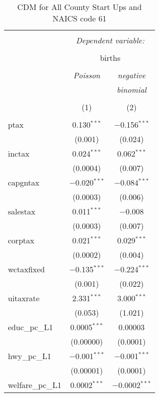 
\begin{table}[!htbp] \centering 
  \caption{CDM for All County Start Ups and NAICS code 61} 
  \label{} 
\begin{tabular}{@{\extracolsep{5pt}}lcc} 
\\[-1.8ex]\hline 
\hline \\[-1.8ex] 
 & \multicolumn{2}{c}{\textit{Dependent variable:}} \\ 
\cline{2-3} 
\\[-1.8ex] & \multicolumn{2}{c}{births} \\ 
\\[-1.8ex] & \textit{Poisson} & \textit{negative} \\ 
 & \textit{} & \textit{binomial} \\ 
\\[-1.8ex] & (1) & (2)\\ 
\hline \\[-1.8ex] 
 ptax & 0.130$^{***}$ & $-$0.156$^{***}$ \\ 
  & (0.001) & (0.024) \\ 
  inctax & 0.024$^{***}$ & 0.062$^{***}$ \\ 
  & (0.0004) & (0.007) \\ 
  capgntax & $-$0.020$^{***}$ & $-$0.084$^{***}$ \\ 
  & (0.0003) & (0.006) \\ 
  salestax & 0.011$^{***}$ & $-$0.008 \\ 
  & (0.0003) & (0.007) \\ 
  corptax & 0.021$^{***}$ & 0.029$^{***}$ \\ 
  & (0.0002) & (0.004) \\ 
  wctaxfixed & $-$0.135$^{***}$ & $-$0.224$^{***}$ \\ 
  & (0.001) & (0.022) \\ 
  uitaxrate & 2.331$^{***}$ & 3.000$^{***}$ \\ 
  & (0.053) & (1.021) \\ 
  educ\_pc\_L1 & 0.0005$^{***}$ & 0.00003 \\ 
  & (0.00000) & (0.0001) \\ 
  hwy\_pc\_L1 & $-$0.001$^{***}$ & $-$0.001$^{***}$ \\ 
  & (0.00001) & (0.0001) \\ 
  welfare\_pc\_L1 & 0.0002$^{***}$ & $-$0.0002$^{***}$ \\ 

\end{tabular}
\end{table}
